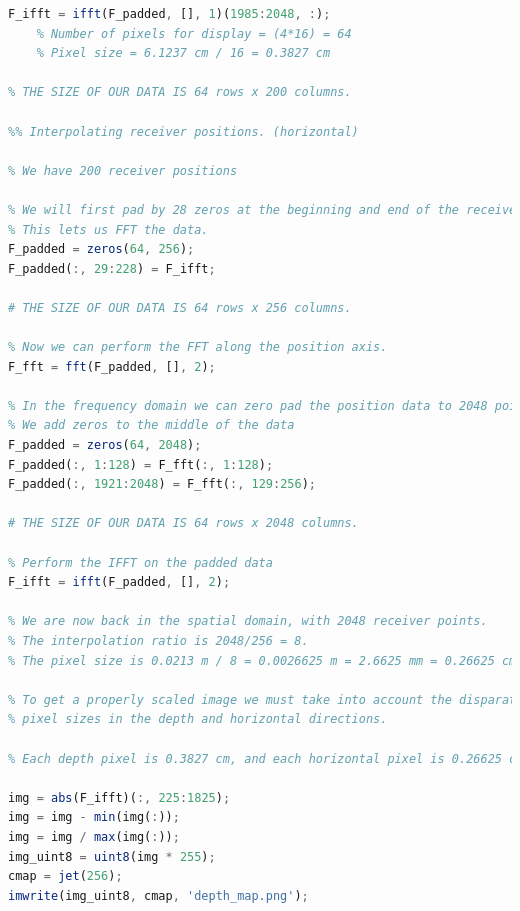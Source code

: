 \documentclass[12pt]{article}
\begin{document}
\begin{lstlisting}[language=Octave, caption=Ground-Penetrating Radar Range Profile Estimation]
F_ifft = ifft(F_padded, [], 1)(1985:2048, :);
    % Number of pixels for display = (4*16) = 64
    % Pixel size = 6.1237 cm / 16 = 0.3827 cm

% THE SIZE OF OUR DATA IS 64 rows x 200 columns.

%% Interpolating receiver positions. (horizontal)

% We have 200 receiver positions

% We will first pad by 28 zeros at the beginning and end of the receiver pos axis.
% This lets us FFT the data.
F_padded = zeros(64, 256);
F_padded(:, 29:228) = F_ifft;

# THE SIZE OF OUR DATA IS 64 rows x 256 columns.

% Now we can perform the FFT along the position axis.
F_fft = fft(F_padded, [], 2);

% In the frequency domain we can zero pad the position data to 2048 points.
% We add zeros to the middle of the data
F_padded = zeros(64, 2048);
F_padded(:, 1:128) = F_fft(:, 1:128);
F_padded(:, 1921:2048) = F_fft(:, 129:256);

# THE SIZE OF OUR DATA IS 64 rows x 2048 columns.

% Perform the IFFT on the padded data
F_ifft = ifft(F_padded, [], 2);

% We are now back in the spatial domain, with 2048 receiver points.
% The interpolation ratio is 2048/256 = 8.
% The pixel size is 0.0213 m / 8 = 0.0026625 m = 2.6625 mm = 0.26625 cm

% To get a properly scaled image we must take into account the disparate
% pixel sizes in the depth and horizontal directions.

% Each depth pixel is 0.3827 cm, and each horizontal pixel is 0.26625 cm.

img = abs(F_ifft)(:, 225:1825);
img = img - min(img(:));
img = img / max(img(:));
img_uint8 = uint8(img * 255);
cmap = jet(256);
imwrite(img_uint8, cmap, 'depth_map.png');

\end{lstlisting}
\end{document}
